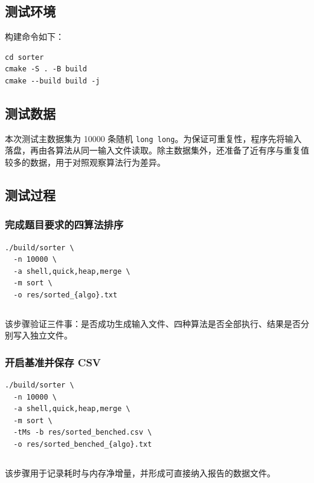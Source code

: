 \documentclass[12pt, a4paper]{ctexart}
\begin{document}
\subsection{测试环境}

构建命令如下：

\begin{verbatim}
cd sorter
cmake -S . -B build
cmake --build build -j
\end{verbatim}

\subsection{测试数据}

本次测试主数据集为 10000 条随机 \texttt{long long}。为保证可重复性，程序先将输入落盘，再由各算法从同一输入文件读取。除主数据集外，还准备了近有序与重复值较多的数据，用于对照观察算法行为差异。

\subsection{测试过程}

\subsubsection{完成题目要求的四算法排序}

\begin{verbatim}
./build/sorter \
  -n 10000 \
  -a shell,quick,heap,merge \
  -m sort \
  -o res/sorted_{algo}.txt
\end{verbatim}

\inputminted{text}{../res/sorted.txt}

该步骤验证三件事：是否成功生成输入文件、四种算法是否全部执行、结果是否分别写入独立文件。

\subsubsection{开启基准并保存 CSV}

\begin{verbatim}
./build/sorter \
  -n 10000 \
  -a shell,quick,heap,merge \
  -m sort \
  -tMs -b res/sorted_benched.csv \
  -o res/sorted_benched_{algo}.txt
\end{verbatim}

\inputminted{text}{../res/sorted_benched.txt}

该步骤用于记录耗时与内存净增量，并形成可直接纳入报告的数据文件。
\end{document}
